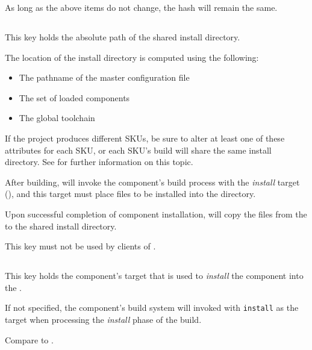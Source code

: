 As long as the above items do not change, the hash will remain the
same.

\subsection{}\label{variables:install-directory}

This key holds the absolute path of the shared install directory.

The location of the install directory is computed using the following:

\begin{itemize}
\item{The pathname of the master configuration file}
\item{The set of loaded components}
\item{The global toolchain}
\end{itemize}

If the project produces different SKUs, be sure to alter at least one
of these attributes for each SKU, or each SKU's build will share the
same install directory.  See  for further
information on this topic.

After building, \lmsbw will invoke the component's build process with
the \emph{install} target (), and this
target must place files to be installed into the \destdir directory.

Upon successful completion of component installation, \lmsbw will copy
the files from the \destdir to the shared install directory.

This key must not be used by clients of \lmsbw.


\subsection{}\label{variables:install-target}

This key holds the component's \makefile target that is used to
\emph{install} the component into the \destdir.

If not specified, the component's build system will invoked with
\texttt{install} as the target when processing the \emph{install}
phase of the build.

Compare to .


